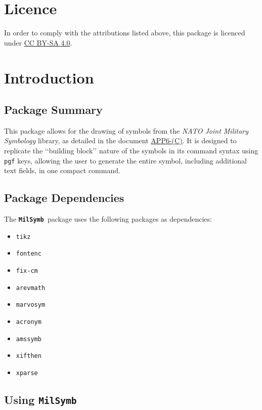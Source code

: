 \documentclass[a4paper, titlepage]{article}
\newcommand\MilSymb{\textbf{\texttt{MilSymb}}}
\newcommand\DocLink{\href{https://www.awl.edu.pl/images/en/APP_6_C.pdf}{APP6-(C)}}
\begin{document}
\section*{Licence}
In order to comply with the attributions listed above, this package is licenced under \href{https://creativecommons.org/licenses/by-sa/4.0/}{CC BY-SA 4.0}.

\clearpage

\tableofcontents

\clearpage

\section{Introduction}

\subsection{Package Summary}

This package allows for the drawing of symbols from the \textit{NATO Joint Military Symbology} library, as detailed in the document \DocLink. It is designed to replicate the \lq\lq{}building block\rq\rq{} nature of the symbols in its command syntax using \texttt{pgf} keys, allowing the user to generate the entire symbol, including additional text fields, in one compact command.

\subsection{Package Dependencies}

The \MilSymb\  package uses the following packages as dependencies:

\begin{itemize}
\item \texttt{tikz}
\item \texttt{fontenc}
\item \texttt{fix-cm}
\item \texttt{arevmath}
\item \texttt{marvosym}
\item \texttt{acronym}
\item \texttt{amssymb}
\item \texttt{xifthen}
\item \texttt{xparse}
\end{itemize}

\subsection{Using \MilSymb}
\end{document}
